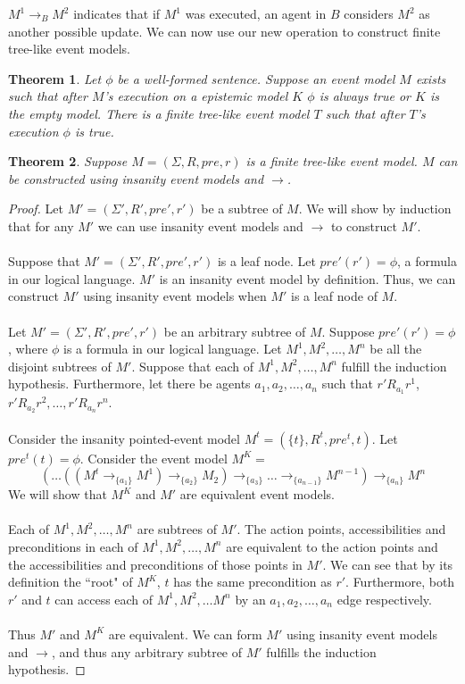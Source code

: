 \documentclass[12pt, a4paper, titlepage]{scrartcl}
\newtheorem{thm}{Theorem}
\begin{document}
$M^1 \to_B M^2$ indicates that if $M^1$ was executed, an agent in $B$ considers $M^2$ as another
possible update.
We can now use our new operation to construct finite tree-like event models.


\begin{thm}
Let $\phi$ be a well-formed sentence.
Suppose an event model $M$ exists such that after $M$'s execution on a epistemic model $K$ $\phi$ is
always true or $K$ is the empty model.
There is a finite tree-like event model $T$ such that after $T$'s execution $\phi$ is true.
\end{thm}

\begin{thm}
Suppose $M = (\Sigma, R, pre, r)$ is a finite tree-like event model.
$M$ can be constructed using insanity event models and $\to$.
\end{thm}
\begin{proof}
Let $M' = (\Sigma', R', pre', r')$ be a subtree of $M$.
We will show by induction that for any $M'$ we can use insanity event models and $\to$ to
construct $M'$.\\
\\
Suppose that $M' = (\Sigma', R', pre', r')$ is a leaf node.
Let $pre'(r') = \phi$, a formula in our logical language.
$M'$ is an insanity event model by definition.
Thus, we can construct $M'$ using insanity event models when $M'$ is a leaf node of $M$.\\
\\
Let $M' = (\Sigma', R', pre', r')$ be an arbitrary subtree of $M$.
Suppose $pre'(r') = \phi$, where $\phi$ is a formula in our logical language.
Let $M^1, M^2, \ldots, M^n$ be all the disjoint subtrees of $M'$.
Suppose that each of $M^1, M^2, \ldots, M^n$ fulfill the induction hypothesis.
Furthermore, let there be agents $a_1, a_2, \ldots, a_n$ such that $r' R_{a_1} r^1$, $r' R_{a_2} r^2,
	\ldots, r' R_{a_n} r^n$.\\
\\
Consider the insanity pointed-event model $M^t = (\{ t \}, R^t, pre^t, t)$.
Let $pre^t(t) = \phi$.
Consider the event model $M^K = $
\[
(\ldots((M^t \to_{\{a_1\}} M ^ 1) \to_{\{a_2\}} M_2) \to_{\{a_3\}} \ldots
\to_{\{a_{n-1}\}} M^{n-1} ) \to_{\{a_n\}} M ^ n
\]
We will show that $M^K$ and $M'$ are equivalent event models.\\
\\
Each of $M^1, M^2, \ldots, M^n$ are subtrees of $M'$.
The action points, accessibilities and preconditions in each of $M^1, M^2, \ldots, M^n$ are
equivalent to the action points and the accessibilities and preconditions of those points in $M'$.
We can see that by its definition the ``root" of $M^K$, $t$ has the same precondition as $r'$.
Furthermore, both $r'$ and $t$ can access each of $M^1, M^2, \ldots M^n$ by an $a_1, a_2, \ldots, a_n$ edge
respectively.\\
\\
Thus $M'$ and $M^K$ are equivalent.
We can form $M'$ using insanity event models and $\to$, and thus any arbitrary subtree of $M'$
fulfills the induction hypothesis.
\end{proof}
\end{document}
